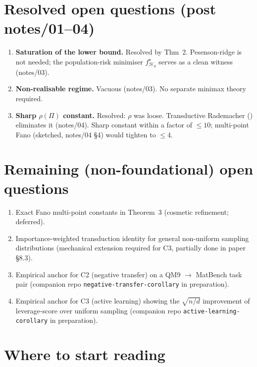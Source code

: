 \documentclass[10pt,a4paper]{article}
\newcommand{\Hcal}{\mathcal{H}}
\begin{document}
\section*{Resolved open questions (post notes/01--04)}

\begin{enumerate}
\item \textbf{Saturation of the lower bound.}  Resolved by Thm~2.
    Pesenson-ridge is not needed; the population-risk minimiser
    $f^\star_{\Hcal_d}$ serves as a clean witness (notes/03).
\item \textbf{Non-realisable regime.}  Vacuous (notes/03).  No
    separate minimax theory required.
\item \textbf{Sharp $\rho(\Pi)$ constant.}  Resolved: $\rho$ was loose.
    Transductive Rademacher (\citealp*{ElYanivPechyony2006}) eliminates
    it (notes/04).  Sharp constant within a factor of $\leq 10$;
    multi-point Fano (sketched, notes/04 §4) would tighten to $\leq 4$.
\end{enumerate}

\section*{Remaining (non-foundational) open questions}

\begin{enumerate}
\item Exact Fano multi-point constants in Theorem~3
    (cosmetic refinement; deferred).
\item Importance-weighted transduction identity for general
    non-uniform sampling distributions (mechanical extension required
    for C3, partially done in paper §8.3).
\item Empirical anchor for C2 (negative transfer) on a QM9 $\to$
    MatBench task pair (companion repo \texttt{negative-transfer-corollary}
    in preparation).
\item Empirical anchor for C3 (active learning) showing the
    $\sqrt{n/d}$ improvement of leverage-score over uniform sampling
    (companion repo \texttt{active-learning-corollary} in preparation).
\end{enumerate}

\section*{Where to start reading}
\end{document}
